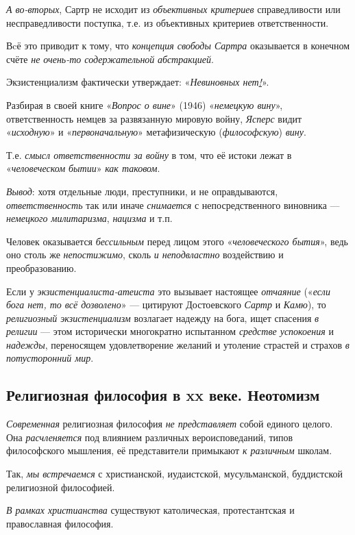 \documentclass[a4paper,14pt,russian]{extreport}
\begin{document}
\emph{А во-вторых}, Сартр не исходит из \emph{объективных критериев} справедливости или несправедливости поступка, т.е. из объективных критериев ответственности.

Вcё это приводит к тому, что \emph{концепция свободы Сартра} оказывается в конечном счёте \emph{не очень-то содержательной} \emph{абстракцией}.

Экзистенциализм фактически утверждает: «\emph{Невиновных нет\underline{!}}».

Разбирая в своей книге «\emph{Вопрос о вине}» (1946) «\emph{немецкую вину}», ответственность немцев за развязанную мировую войну, \emph{Ясперс} видит «\emph{исходную}» и «\emph{первоначальную}» метафизическую (\emph{философскую}) \emph{вину}.

Т.е. \emph{смысл ответственности за войну} в том, что её истоки лежат в «\emph{человеческом бытии}» \emph{как таковом}.

\emph{Вывод}: хотя отдельные люди, преступники, и не оправдываются, \emph{ответственность} так или иначе \emph{снимается} с непосредственного виновника --- \emph{немецкого милитаризма}, \emph{нацизма} и т.п.

Человек оказывается \emph{бессильным} перед лицом этого «\emph{человеческого бытия}», ведь оно столь же \emph{непостижимо}, сколь \emph{и неподвластно} воздействию и преобразованию.

Если у \emph{экзистенциалиста-атеиста} это вызывает настоящее \emph{отчаяние} («\emph{если бога нет, то всё дозволено}» --- цитируют Достоевского \emph{Сартр} и \emph{Камю}), то \emph{религиозный экзистенциализм} возлагает надежду на бога, ищет спасения \emph{в религии} --- этом исторически многократно испытанном \emph{средстве успокоения} и \emph{надежды}, переносящем удовлетворение желаний и утоление страстей и страхов \emph{в потусторонний мир}.

\subsection{Религиозная философия в xx веке. Неотомизм}

\emph{Современная} религиозная философия \emph{не представляет} собой единого целого. Она \emph{расчленяется} под влиянием различных вероисповеданий, типов философского мышления, её представители примыкают \emph{к различным} школам.

Так, \emph{мы встречаемся} с христианской, иудаистской, мусульманской, буддистской религиозной философией.

\emph{В рамках христианства} существуют католическая, протестантская и православная философия.
\end{document}

